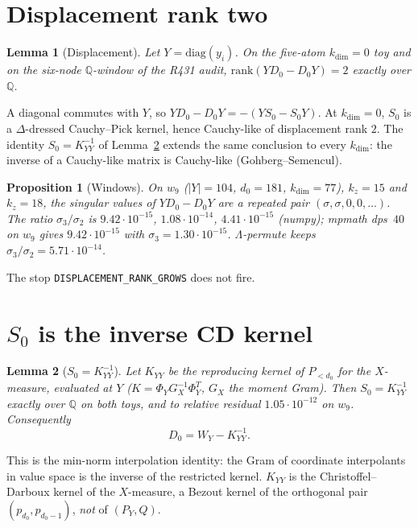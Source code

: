 \documentclass[11pt]{article}
\newtheorem{lemma}{Lemma}
\newtheorem{prop}{Proposition}
\theoremstyle{remark}
\begin{document}
\section{Displacement rank two}

\begin{lemma}[Displacement]\label{lem:disp}
Let $Y=\mathrm{diag}(y_i)$.
On the five-atom $k_{\dim}=0$ toy and on the six-node
$\mathbb{Q}$-window of the R431 audit,
$\mathrm{rank}(YD_0-D_0Y)=2$ exactly over $\mathbb{Q}$.
\end{lemma}

A diagonal commutes with $Y$, so
$YD_0-D_0Y=-(YS_0-S_0Y)$.
At $k_{\dim}=0$, $S_0$ is a $\Delta$-dressed Cauchy--Pick
kernel, hence Cauchy-like of displacement rank $2$.
The identity $S_0=K_{YY}^{-1}$ of Lemma~\ref{lem:kinv}
extends the same conclusion to every $k_{\dim}$: the
inverse of a Cauchy-like matrix is Cauchy-like
(Gohberg--Semencul).

\begin{prop}[Windows]\label{prop:windows}
On $w_9$ ($\lvert Y\rvert=104$, $d_0=181$, $k_{\dim}=77$),
$k_z=15$ and $k_z=18$, the singular values of $YD_0-D_0Y$
are a repeated pair $(\sigma,\sigma,0,0,\ldots)$.
The ratio $\sigma_3/\sigma_2$ is $9.42\cdot 10^{-15}$,
$1.08\cdot 10^{-14}$, $4.41\cdot 10^{-15}$ (numpy);
mpmath dps~$40$ on $w_9$ gives $9.42\cdot 10^{-15}$
with $\sigma_3=1.30\cdot 10^{-15}$.
$\Lambda$-permute keeps $\sigma_3/\sigma_2=5.71\cdot 10^{-14}$.
\end{prop}

The stop \texttt{DISPLACEMENT\_RANK\_GROWS} does not fire.

\section{$S_0$ is the inverse CD kernel}

\begin{lemma}[$S_0=K_{YY}^{-1}$]\label{lem:kinv}
Let $K_{YY}$ be the reproducing kernel of $P_{<d_0}$
for the $X$-measure, evaluated at $Y$
($K=\Phi_Y G_X^{-1}\Phi_Y^T$, $G_X$ the moment Gram).
Then $S_0=K_{YY}^{-1}$ exactly over $\mathbb{Q}$ on both
toys, and to relative residual $1.05\cdot 10^{-12}$ on
$w_9$.
Consequently
\begin{equation}\label{eq:D0K}
D_0=W_Y-K_{YY}^{-1}.
\end{equation}
\end{lemma}

This is the min-norm interpolation identity: the Gram of
coordinate interpolants in value space is the inverse of
the restricted kernel.
$K_{YY}$ is the Christoffel--Darboux kernel of the
$X$-measure, a Bezout kernel of the orthogonal pair
$(p_{d_0},p_{d_0-1})$, \emph{not} of $(P_Y,Q)$.
\end{document}
